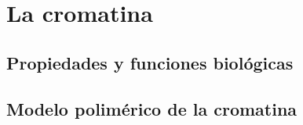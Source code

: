\chapter{La cromatina}
\label{cap:chromatin}

\section{Propiedades y funciones biológicas}

\section{Modelo polimérico de la cromatina}
